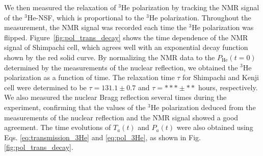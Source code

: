 \documentclass[%
 reprint,
superscriptaddress,
 amsmath,amssymb,
 aps,
floatfix,
]{revtex4-2}
\newcommand{\He}{$^3$He }
\newcommand{\Hensf}{$^3$He-NSF}
\begin{document}
We then measured the relaxation of \He polarization by tracking the NMR signal of the \Hensf, which is proportional to the \He polarization. 
Throughout the measurement, the NMR signal was recorded each time the \He polarization was flipped.
Figure~\ref{fig:pol_trans_decay} shows the time dependence of the NMR signal of Shimpachi cell, which agrees well with an exponential decay function shown by the red solid curve. 
By normalizing the NMR data to the $P_\mathrm{He}(t=0)$ determined by the measurements of the nuclear reflection, we obtained the \He polarization as a function of time. %
The relaxation time $\tau$ for Shimpachi and Kenji cell were determined to be $\tau = 131.1 \pm 0.7$ and $\tau = *** \pm **$ hours, respectively. 
We also measured the nuclear Bragg reflection several times during the experiment, confirming that the values of the \He polarization deduced from the measurements of the nuclear reflection and the NMR signal showed a good agreement. %
The time evolutions of $T_a(t)$ and $P_a(t)$ were also obtained using Eqs. \ref{eq:transmission_3He} and \ref{eq:pol_3He}, as shown in Fig. \ref{fig:pol_trans_decay}. 
\end{document}
